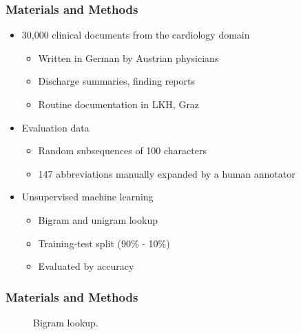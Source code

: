 

\begin{frame}
	\frametitle{Materials and Methods}
	\begin{itemize} \myspacing
		\item 30,000 clinical documents from the cardiology domain
		\begin{itemize}
			\item Written in German by Austrian physicians
			\item Discharge summaries, finding reports        
                         \item Routine documentation in LKH, Graz
                \end{itemize}
                \item Evaluation data
                \begin{itemize}
                		\item Random subsequences of 100 characters
			\item 147 abbreviations manually expanded by a human annotator
                \end{itemize}
                \item Unsupervised machine learning
                \begin{itemize}
			\item Bigram and unigram lookup
			\item Training-test split (90\% - 10\%)
			\item Evaluated by accuracy
                \end{itemize}
	\end{itemize}
\end{frame}

\begin{frame}
	\frametitle{Materials and Methods}
                \begin{figure}
        			\centering
        			\caption{Bigram lookup.}
        			\label{fig:bigram_lookup}
  		\end{figure}
\end{frame}



